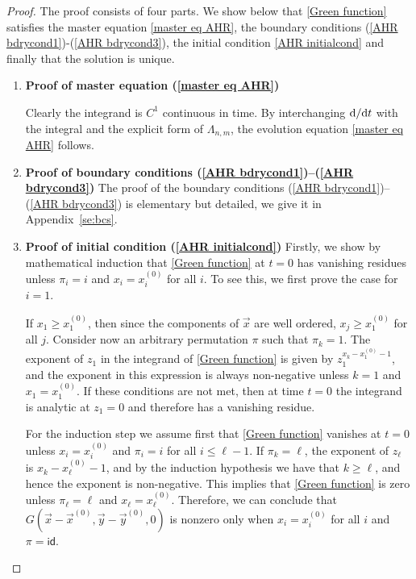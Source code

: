 \documentclass[cmp]{svjour}
\numberwithin{theorem}{section}
\numberwithin{equation}{section}
\begin{document}
\begin{proof}
The proof consists of four parts. We show below that \eqref{Green function} satisfies the master equation \eqref{master eq AHR}, the boundary conditions (\ref{AHR bdrycond1})-(\ref{AHR bdrycond3}), the initial condition \eqref{AHR initialcond} and finally that the solution is unique. 

\begin{enumerate}[label=(\roman*)]
\item \textbf{Proof of master equation (\ref{master eq AHR})}

Clearly the integrand is $C^1$ continuous in time. By interchanging ${\rm d}/{\rm d} t$ with the integral and the explicit form of $\Lambda_{n,m}$, the evolution equation \eqref{master eq AHR} follows.\\


\item \textbf{Proof of boundary conditions (\ref{AHR bdrycond1})--(\ref{AHR bdrycond3})}
The proof of the boundary conditions (\ref{AHR bdrycond1})--(\ref{AHR bdrycond3}) is elementary but detailed, we give it in Appendix~\ref{se:bcs}. \\


\item\textbf{Proof of initial condition (\ref{AHR initialcond})}
Firstly, we show by mathematical induction that \eqref{Green function} at $t=0$ has vanishing residues unless $\pi_i=i$ and $x_i=x_i^{(0)}$ for all $i$. To see this, we first prove the case for $i=1$.



If $x_1 \geq x_1^{(0)}$, then since the components of $\vec{x}$ are well ordered, $x_j \geq x_1^{(0)}$ for all $j$. Consider now an arbitrary permutation $\pi$ such that $\pi_k=1$. The exponent of $z_1$ in the integrand of \eqref{Green function} is given by $z_1^{x_k-x_1^{(0)}-1}$, and the exponent in this expression is always non-negative unless $k=1$ and $x_1=x_1^{(0)}$. If these conditions are not met, then at time $t=0$ the integrand is analytic at $z_1=0$ and therefore has a vanishing residue.


For the induction step we assume first that \eqref{Green function} vanishes at $t=0$ unless $x_i=x_i^{(0)}$ and $\pi_i=i$ for all $i\leq \ell-1$. If $\pi_k=\ell$, the exponent of $z_{\ell}$ is $x_k-x_{\ell}^{(0)}-1$, and by the induction hypothesis we have that $k \geq \ell$, and hence the exponent is non-negative. This implies that \eqref{Green function} is zero unless $\pi_{\ell}=\ell$ and $x_{\ell} = x_{\ell}^{(0)}$. Therefore, we can conclude that $G(\vec{x}-\vec{x}^{(0)},\vec{y}-\vec{y}^{(0)},0)$ is nonzero only when $x_i=x_i^{(0)}$ for all $i$ and $\pi=\textsf{id}$.




\end{enumerate}
\end{proof}
\end{document}
